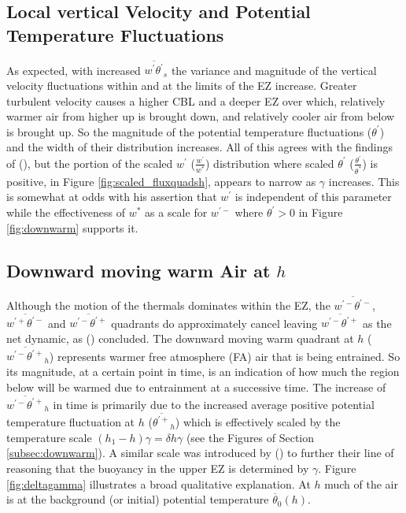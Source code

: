 \subsection{Local vertical Velocity and Potential Temperature Fluctuations}

As expected, with increased $\overline{w^{'}\theta^{'}}_{s}$ the variance and magnitude of the vertical velocity fluctuations within and at the limits of the \acs{EZ} increase.  Greater turbulent velocity causes a higher \acs{CBL} and a deeper \acs{EZ} over which, relatively warmer air from higher up is brought down, and relatively cooler air from below is brought up.  So the magnitude of the potential temperature fluctuations ($\theta^{'}$) and the width of their distribution increases. All of this agrees with the findings of \citeauthor{Sorbjan1} (\citeyear{Sorbjan1}), but the portion of the scaled $w^{'}$ ($\frac{w^{'}}{w^{*}}$) distribution where scaled $\theta^{'}$ ($\frac{\theta^{'}}{\theta^{*}}$) is positive, in Figure \ref{fig:scaled_fluxquadsh}, appears to narrow as $\gamma$ increases. This is somewhat at odds with his assertion that $w^{'}$ is independent of this parameter while the effectiveness of $w^{*}$ as a scale for $w^{'-}$ where $\theta^{'}>0$ in Figure \ref{fig:downwarm} supports it.\\

\subsection{Downward moving warm Air at $h$}

 Although the motion of the thermals dominates within the \acs{EZ}, the $\overline{w^{'-}\theta^{'-}}$, $\overline{w^{'+}\theta^{'-}}$ and $\overline{w^{'-}\theta^{'+}}$ quadrants do approximately cancel leaving $\overline{w^{'-}\theta^{'+}}$ as the net dynamic, as \citeauthor{SullMoengStev} (\citeyear{SullMoengStev}) concluded. The downward moving warm quadrant at $h$ ($\overline{w^{'-}\theta^{'+}}_{h}$) represents warmer free atmosphere (\acs{FA}) air that is being entrained.  So its magnitude, at a certain point in time, is an indication of how much the region below will be warmed due to entrainment at a successive time.  The increase of $\overline{w^{'-}\theta^{'+}}_{h}$ in time is primarily due to the increased average positive potential temperature fluctuation at $h$ ($\overline{\theta^{'+}}_{h}$) which is effectively scaled by the temperature scale $(h_{1}-h)\gamma = \delta h \gamma$ (see the Figures of Section \ref{subsec:downwarm}).  A similar scale was introduced by \citeauthor{GarciaMellado} (\citeyear{GarciaMellado}) to further their line of reasoning that the buoyancy in the upper \acs{EZ} is determined by $\gamma$. Figure \ref{fig:deltagamma} illustrates a broad qualitative explanation.  At $h$ much of the air is at the background (or initial) potential temperature $\overline{\theta}_{0}(h)$. 

